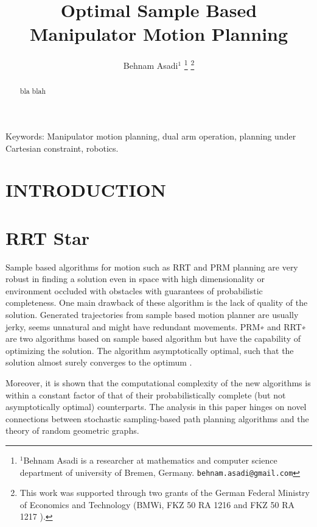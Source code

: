 \documentclass[letterpaper, 9pt, conference]{ieeeconf}  %
\title{\LARGE \bf
Optimal Sample Based Manipulator Motion Planning}
\author{Behnam Asadi$^{1}$ 
\thanks{$^{1}$Behnam Asadi is a researcher at mathematics and computer science department of university of Bremen, Germany.
        {\tt\small behnam.asadi@gmail.com}}%
\thanks{This work was supported through two grants of the German Federal Ministry of Economics and Technology (BMWi, FKZ 50 RA 1216 and FKZ 50 RA 1217 ).}
}
\begin{document}
\maketitle
\thispagestyle{empty}
\pagestyle{empty}




\begin{abstract}

bla blah
\end{abstract}
Keywords: Manipulator motion planning, dual arm operation, planning under Cartesian constraint, robotics. 

\section{INTRODUCTION}\label{Introduction}

\section{RRT Star}\label{RRT_Star}




Sample based algorithms for motion such as RRT and PRM planning are very robust in finding a solution even in space with high dimensionality or environment occluded with obstacles with guarantees of probabilistic completeness. One main drawback of these algorithm is the lack of quality of the solution.
Generated trajectories from sample based motion planner are usually jerky, seems unnatural and might have redundant movements.
PRM∗ and RRT∗ are two algorithms based on sample based algorithm but have the capability of optimizing the solution. The algorithm asymptotically optimal, such that the solution almost surely converges to the optimum \cite{karaman2011sampling}.

 Moreover, it is shown that the computational complexity of the new algorithms is within a constant factor of that of their probabilistically complete (but not asymptotically optimal) counterparts. The analysis in this paper hinges on novel connections between stochastic sampling-based path planning algorithms and the theory of random geometric graphs.
\end{document}
